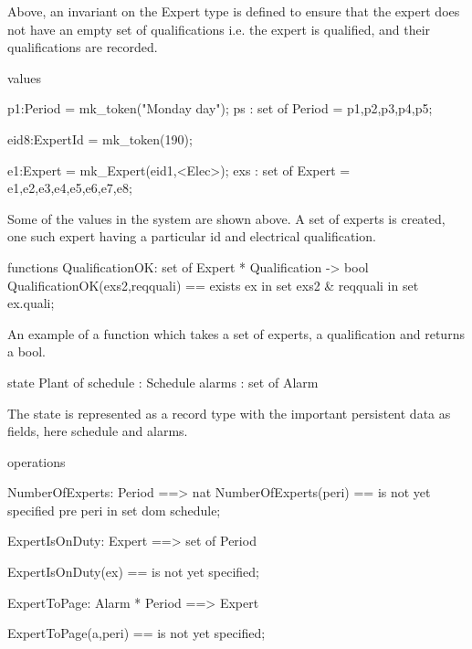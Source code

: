 Above, an invariant on the Expert type is defined to ensure that the expert does not have an empty set of qualifications i.e. the expert is qualified, and their qualifications are recorded.

\begin{vdmsl}[label=lst:AlarmSL.vdmsl,caption=Alarm system's values in VDM-SL]
values
 
  p1:Period = mk_token("Monday day");
  ps : set of Period = {p1,p2,p3,p4,p5};

  eid8:ExpertId = mk_token(190);
  
  e1:Expert = mk_Expert(eid1,{<Elec>});
  exs : set of Expert = {e1,e2,e3,e4,e5,e6,e7,e8};
\end{vdmsl}

Some of the values in the system are shown above. A set of experts is created, one such expert having a particular id and electrical qualification.

\begin{vdmsl}[label=lst:AlarmSL.vdmsl,caption=An alarm system function in VDM-SL]
functions
  QualificationOK: set of Expert * Qualification -> bool
  QualificationOK(exs2,reqquali) ==
    exists ex in set exs2 & reqquali in set ex.quali;
\end{vdmsl}

An example of a function which takes a set of experts, a qualification and returns a bool.

\begin{vdmsl}[label=lst:AlarmSL.vdmsl,caption=Alarm system's persistent state in VDM-SL]
state Plant of
schedule : Schedule
alarms : set of Alarm

\end{vdmsl}

The state is represented as a record type with the important persistent data as fields, here schedule and alarms.

\begin{vdmsl}[label=lst:AlarmSL.vdmsl,caption=Operations on the state of the alarm system in VDM-SL]
operations

NumberOfExperts: Period ==> nat
NumberOfExperts(peri) == is not yet specified
pre peri in set dom schedule;

ExpertIsOnDuty: Expert ==> set of Period

ExpertIsOnDuty(ex) == is not yet specified;

ExpertToPage: Alarm * Period ==> Expert

ExpertToPage(a,peri) == is not yet specified;
\end{vdmsl}

